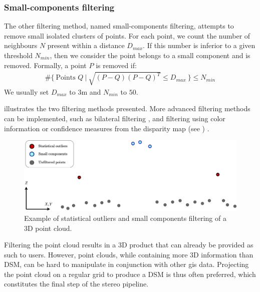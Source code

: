 \subsubsection{Small-components filtering}
The other filtering method, named small-components filtering, attempts to remove small isolated clusters of points. For each point, we count the number of neighbours $N$ present within a distance $D_{max}$. If this number is inferior to a given threshold $N_{min}$, then we consider the point belongs to a small component and is removed. Formally, a point $P$ is removed if:
\begin{align}\label{eq:small_components}
    \#\{~\text{Points } Q~|~\sqrt{(P-Q)(P-Q)^T}\leqslant D_{max}~\}\leqslant N_{min}
\end{align}
We usually set $D_{max}$ to $3$m and $N_{min}$ to $50$.

 illustrates the two filtering methods presented. More advanced filtering methods can be implemented, such as bilateral filtering \cite{digne_bilateral_2017}, and filtering using color information or confidence measures from the disparity map (see ) \cite{youssefi_geometrically_2024}.

\begin{figure}
    \centering
    \includegraphics[width=\linewidth]{Images/Chap_1/Point_cloud_filtering.png}
    \caption{Example of statistical outliers and small components filtering of a 3D point cloud.}
    \label{fig:point_cloud_filtering}
\end{figure}

Filtering the point cloud results in a 3D product that can already be provided as such to users. However, point clouds, while containing more 3D information than DSM, can be hard to manipulate in conjunction with other \acrshort{gis} data. Projecting the point cloud on a regular grid to produce a DSM is thus often preferred, which constitutes the final step of the stereo pipeline.

